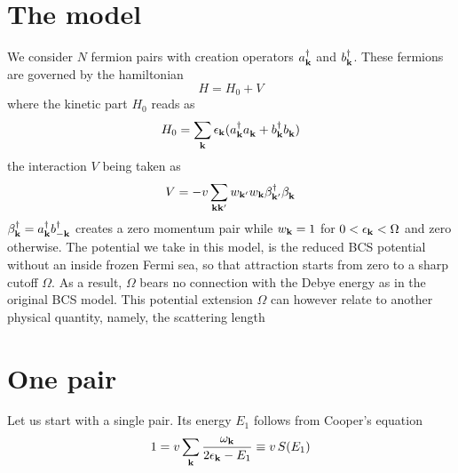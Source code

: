 \documentclass[3p,twocolumn]{elsarticle}
\begin{document}
\section{The model\label{sec:model}}
We consider $N$ fermion pairs with creation operators $a_{\mathbf{k}}^\dagger$ and $b_{\mathbf{k}}^\dagger$.  These fermions are  governed by the hamiltonian
\begin{equation}
H=H_{0}+V
\end{equation}
where  the kinetic part $H_0$ reads as 
\begin{equation}
H_0=\sum_{\mathbf{k}}\epsilon_{\mathbf{k}}(a^\dagger_{\mathbf{k}}{}a^{}_{\mathbf{k}}+b^\dagger_{\mathbf{k}}{}b^{}_{\mathbf{k}})
\label{eq:}
\end{equation}
the interaction $V$ being taken as 
\begin{equation}
V=-v\sum_{\mathbf{k}\mathbf{k}'}w_{\mathbf{k}'}w_{\mathbf{k}}\beta^\dagger_{\mathbf{k}'}{}\beta^{}_{\mathbf{k}}
\label{eq:VBcs}
\end{equation}
 $\beta^\dagger_{\mathbf{k}}=a^\dagger_{\mathbf{k}}b^\dagger_{-\mathbf{k}}$ creates a zero momentum pair while $w_{\mathbf{k}}=1$ for $0<\epsilon_{\mathbf{k}}<\Omega$ and zero otherwise.  The potential we take in this model, is the reduced BCS  potential without an inside frozen Fermi sea, so that attraction starts from zero to a sharp cutoff $\Omega$.  As a result,  $\Omega$ bears no connection with the Debye energy as in the original BCS model. This potential extension $\Omega$ can however relate to another physical quantity, namely, the scattering length %
\section{One pair\label{sec:onePair}}
Let us start with a single pair. Its energy $E_1$ follows from Cooper's equation
\begin{equation}
1=v\sum_{\mathbf{k}}\frac{\omega_{\mathbf{k}}}{2\epsilon_{\mathbf{k}}-E_1}\equiv{}v\,S(E_1)
\label{eq:onePair}
\end{equation}
\end{document}
